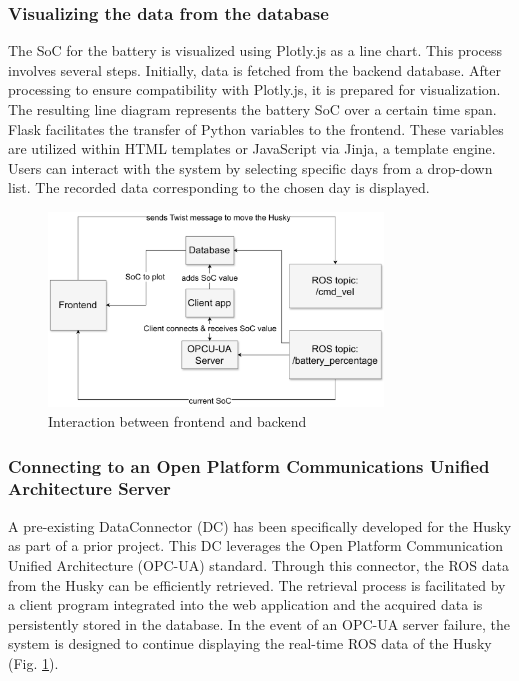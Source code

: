 \documentclass[conference]{IEEEtran}
\begin{document}
\subsubsection{Visualizing the data from the database}
The SoC for the battery is visualized using Plotly.js as a line chart. This process involves several steps. Initially, data is fetched from the backend database. After processing to ensure compatibility with Plotly.js, it is prepared for visualization. The resulting line diagram represents the battery SoC over a certain time span. Flask facilitates the transfer of Python variables to the frontend. 
These variables are utilized within HTML templates or JavaScript via Jinja, a template engine. Users can interact with the system by selecting specific days from a drop-down list. The recorded data corresponding to the chosen day is displayed.
\begin{figure}[tp]
    \centerline{\includegraphics[width=8.9cm]{Pictures/backfrontbig.pdf}}
    \caption{Interaction between frontend and backend}
    \label{fig:backfront}
\end{figure}
\subsubsection{Connecting to an Open Platform Communications Unified Architecture Server}
A pre-existing DataConnector (DC) has been specifically developed for the Husky as part of a prior project. This DC leverages the Open Platform Communication Unified Architecture (OPC-UA) standard. Through this connector, the ROS data from the Husky can be efficiently retrieved. The retrieval process is facilitated by a client program integrated into the web application and the acquired data is persistently stored in the database. 
In the event of an OPC-UA server failure, the system is designed to continue displaying the real-time ROS data of the Husky (Fig. \ref{fig:backfront}).
\end{document}
